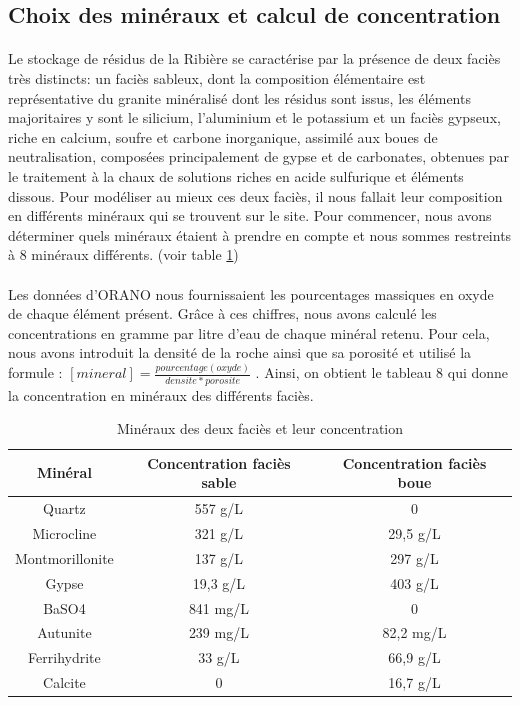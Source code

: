 \documentclass{article}
\begin{document}
\subsection{Choix des minéraux et calcul de concentration}

\paragraph{} Le stockage de résidus de la Ribière se caractérise par la présence de deux faciès très distincts: un faciès sableux, dont la composition élémentaire est représentative du granite minéralisé dont les résidus sont issus, les éléments majoritaires y sont le silicium, l’aluminium et le potassium et un faciès gypseux, riche en calcium, soufre et carbone inorganique, assimilé aux boues de neutralisation, composées principalement de gypse et de carbonates, obtenues par le traitement à la chaux de solutions riches en acide sulfurique et éléments dissous. Pour modéliser au mieux ces deux faciès, il nous fallait leur composition en différents minéraux qui se trouvent sur le site. Pour commencer, nous avons déterminer quels minéraux étaient à prendre en compte et nous sommes restreints à 8 minéraux différents. (voir table  \ref{tab:mineraux_concentrations})
\paragraph{} Les données d'ORANO nous fournissaient les pourcentages massiques en oxyde de chaque élément présent. Grâce à ces chiffres, nous avons calculé les concentrations en gramme par litre d'eau de chaque minéral retenu. Pour cela, nous avons introduit la densité de la roche ainsi que sa porosité et utilisé la formule : $[mineral] = \frac{pourcentage(oxyde)}{densite * porosite} $ . Ainsi, on obtient le tableau 8 qui donne la concentration en minéraux des différents faciès.

\begin{table}[H]
    \centering    
    \caption{Minéraux des deux faciès et leur concentration }
    \begin{tabular}{ |c |c |c |}
        \hline
         \textbf{Minéral} & \textbf{Concentration faciès sable} & \textbf{Concentration faciès boue}\\ 
         \hline
         Quartz & 557 g/L & 0 \\ 
         \hline
         Microcline & 321 g/L & 29,5 g/L  \\
         \hline
         Montmorillonite & 137 g/L & 297 g/L  \\
         \hline
         Gypse & 19,3 g/L & 403 g/L  \\
         \hline
         BaSO4 & 841 mg/L & 0  \\
          \hline
         Autunite & 239 mg/L & 82,2 mg/L  \\
          \hline
         Ferrihydrite & 33 g/L & 66,9 g/L  \\
          \hline
         Calcite & 0 & 16,7 g/L \\
         \hline
    \end{tabular}

    \label{tab:mineraux_concentrations}
\end{table}
\end{document}
